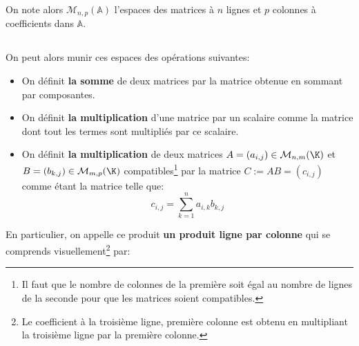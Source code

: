 On note alors \(\mathcal{M}_{n, p}(\mathbb{A})\) l'espaces des matrices à \( n \) lignes et \( p \) colonnes à coefficients dans \( \mathbb{A} \).

\subsection*{}
On peut alors munir ces espaces des opérations suivantes:
\begin{itemize}
   \item On définit \textbf{la somme} de deux matrices par la matrice obtenue en sommant par composantes.
   \item On définit \textbf{la multiplication} d'une matrice par un scalaire comme la matrice dont tout les termes sont multipliés par ce scalaire.
   \item On définit \textbf{la multiplication} de deux matrices \(A = (a_{i, j}) \in \mathcal{M}_{n, m}(\K)\) et \(B = (b_{k, j}) \in \mathcal{M}_{m, p}(\K)\) compatibles\footnote[1]{Il faut que le nombre de colonnes de la première soit égal au nombre de lignes de la seconde pour que les matrices soient compatibles.} par la matrice \(C := AB = (c_{i,j})\) comme étant la matrice telle que:
   \[
      c_{i, j} = \sum_{k=1}^{n}a_{i, k}b_{k, j}
   \]
\end{itemize} 
En particulier, on appelle ce produit \textbf{un produit ligne par colonne} qui se comprends visuellement\footnote[2]{Le coefficient à \color{BrightRed1} la troisième ligne, première colonne \color{black} est obtenu en multipliant \color{BrightBlue1} la troisième ligne par la première colonne.\color{black}} par:
